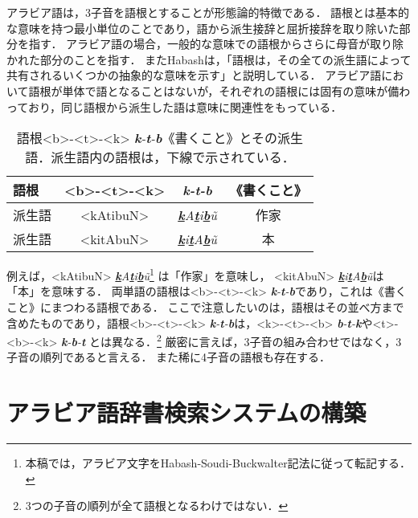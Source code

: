\documentclass[technicalreport]{ieicej}
\begin{document}
アラビア語は，3子音を語根とすることが形態論的特徴である．
語根とは基本的な意味を持つ最小単位のことであり，語から派生接辞と屈折接辞を取り除いた部分を指す\cite{nishihara2012}．
アラビア語の場合，一般的な意味での語根からさらに母音が取り除かれた部分のことを指す．
またHabash\cite{habash2010}は，「語根は，その全ての派生語によって共有されるいくつかの抽象的な意味を示す」と説明している．
アラビア語において語根が単体で語となることはないが，それぞれの語根には固有の意味が備わっており，同じ語根から派生した語は意味に関連性をもっている．

\begin{table}[ht]
\begin{center}
\begin{tabular}{l|ccc}
   語根& <b>-<t>-<k> & \textit{\textbf{k}-\textbf{t}-\textbf{b}} & 《書くこと》\\
  \hline
 派生語& <kAtibuN> & \textit{\underline{\textbf{k}}A\underline{\textbf{t}}i\underline{\textbf{b}}\~u} & 作家\\
  派生語& <kitAbuN> & \textit{\underline{\textbf{k}}i\underline{\textbf{t}}A\underline{\textbf{b}}\~u} & 本\\
\hline
\end{tabular}
\caption{語根<b>-<t>-<k> \textit{\textbf{k}-\textbf{t}-\textbf{b}}《書くこと》とその派生語．派生語内の語根は，下線で示されている．}
\label{table:alignment}
\end{center}
\end{table}

例えば，<kAtibuN> \textit{\underline{\textbf{k}}A\underline{\textbf{t}}i\underline{\textbf{b}}\~u}\footnote{本稿では，アラビア文字をHabash-Soudi-Buckwalter記法\cite{hsb}に従って転記する．} は「作家」を意味し， <kitAbuN> \textit{\underline{\textbf{k}}i\underline{\textbf{t}}A\underline{\textbf{b}}\~u}は「本」を意味する．
両単語の語根は<b>-<t>-<k> \textit{\textbf{k}-\textbf{t}-\textbf{b}}であり，これは《書くこと》にまつわる語根である．
ここで注意したいのは，語根はその並べ方まで含めたものであり，語根<b>-<t>-<k> \textit{\textbf{k}-\textbf{t}-\textbf{b}}は，<k>-<t>-<b> \textit{\textbf{b}-\textbf{t}-\textbf{k}}や<t>-<b>-<k> \textit{\textbf{k}-\textbf{b}-\textbf{t}} とは異なる．\footnote{3つの子音の順列が全て語根となるわけではない．}
厳密に言えば，3子音の組み合わせではなく，3子音の順列であると言える．
また稀に4子音の語根も存在する．

\section{アラビア語辞書検索システムの構築}
\end{document}
